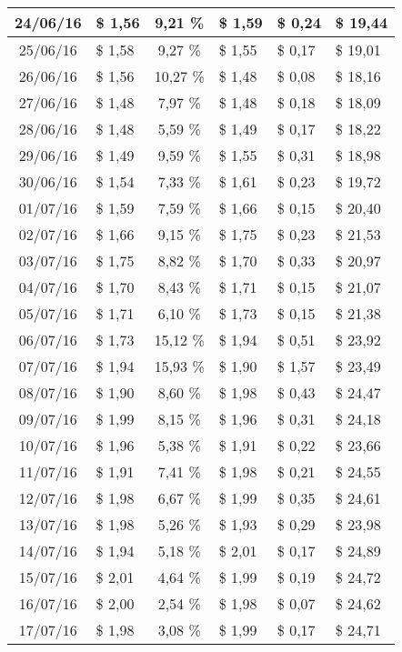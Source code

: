 \begin{center}
\begin{small}
\begin{longtable}{|c|l|c|l|l|l|}
24/06/16 & \$ 1,56 & 9,21 \% & \$ 1,59 & \$ 0,24 & \$ 19,44 \\ \hline
25/06/16 & \$ 1,58 & 9,27 \% & \$ 1,55 & \$ 0,17 & \$ 19,01 \\ \hline
26/06/16 & \$ 1,56 & 10,27 \% & \$ 1,48 & \$ 0,08 & \$ 18,16 \\ \hline
27/06/16 & \$ 1,48 & 7,97 \% & \$ 1,48 & \$ 0,18 & \$ 18,09 \\ \hline
28/06/16 & \$ 1,48 & 5,59 \% & \$ 1,49 & \$ 0,17 & \$ 18,22 \\ \hline
29/06/16 & \$ 1,49 & 9,59 \% & \$ 1,55 & \$ 0,31 & \$ 18,98 \\ \hline
30/06/16 & \$ 1,54 & 7,33 \% & \$ 1,61 & \$ 0,23 & \$ 19,72 \\ \hline
01/07/16 & \$ 1,59 & 7,59 \% & \$ 1,66 & \$ 0,15 & \$ 20,40 \\ \hline
02/07/16 & \$ 1,66 & 9,15 \% & \$ 1,75 & \$ 0,23 & \$ 21,53 \\ \hline
03/07/16 & \$ 1,75 & 8,82 \% & \$ 1,70 & \$ 0,33 & \$ 20,97 \\ \hline
04/07/16 & \$ 1,70 & 8,43 \% & \$ 1,71 & \$ 0,15 & \$ 21,07 \\ \hline
05/07/16 & \$ 1,71 & 6,10 \% & \$ 1,73 & \$ 0,15 & \$ 21,38 \\ \hline
06/07/16 & \$ 1,73 & 15,12 \% & \$ 1,94 & \$ 0,51 & \$ 23,92 \\ \hline
07/07/16 & \$ 1,94 & 15,93 \% & \$ 1,90 & \$ 1,57 & \$ 23,49 \\ \hline
08/07/16 & \$ 1,90 & 8,60 \% & \$ 1,98 & \$ 0,43 & \$ 24,47 \\ \hline
09/07/16 & \$ 1,99 & 8,15 \% & \$ 1,96 & \$ 0,31 & \$ 24,18 \\ \hline
10/07/16 & \$ 1,96 & 5,38 \% & \$ 1,91 & \$ 0,22 & \$ 23,66 \\ \hline
11/07/16 & \$ 1,91 & 7,41 \% & \$ 1,98 & \$ 0,21 & \$ 24,55 \\ \hline
12/07/16 & \$ 1,98 & 6,67 \% & \$ 1,99 & \$ 0,35 & \$ 24,61 \\ \hline
13/07/16 & \$ 1,98 & 5,26 \% & \$ 1,93 & \$ 0,29 & \$ 23,98 \\ \hline
14/07/16 & \$ 1,94 & 5,18 \% & \$ 2,01 & \$ 0,17 & \$ 24,89 \\ \hline
15/07/16 & \$ 2,01 & 4,64 \% & \$ 1,99 & \$ 0,19 & \$ 24,72 \\ \hline
16/07/16 & \$ 2,00 & 2,54 \% & \$ 1,98 & \$ 0,07 & \$ 24,62 \\ \hline
17/07/16 & \$ 1,98 & 3,08 \% & \$ 1,99 & \$ 0,17 & \$ 24,71 \\ \hline

\end{longtable}
\end{small}
\end{center}

